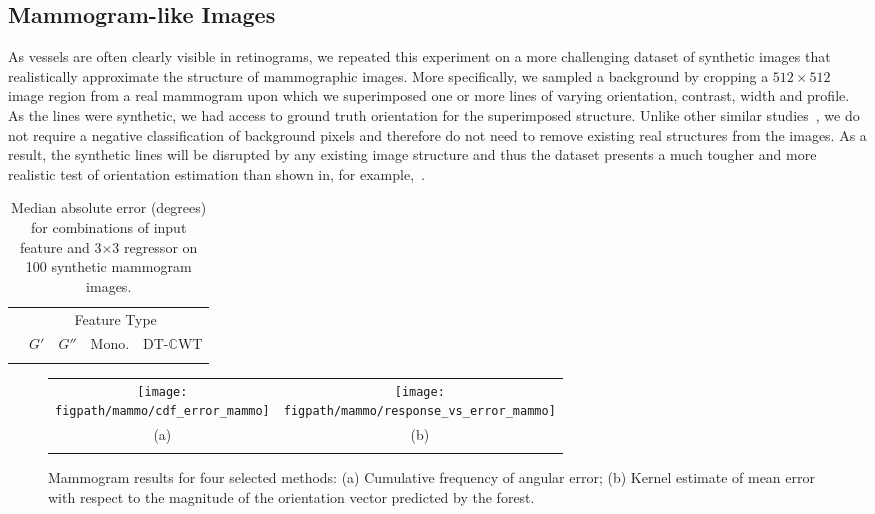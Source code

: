 \documentclass[10pt,twocolumn,letterpaper]{article}
\def\dtcwt{DT-$\mathbb{C}$WT}
\begin{document}
\subsection{Mammogram-like Images}
\label{s:expts_synth_mammography}
As vessels are often clearly visible in retinograms, we repeated this experiment on a more challenging dataset of synthetic images that realistically approximate the structure of mammographic images. More specifically, we sampled a background by cropping a $512{\times}512$ image region from a real mammogram upon which we superimposed one or more lines of varying orientation, contrast, width and profile. As the lines were synthetic, we had access to ground truth orientation for the superimposed structure. Unlike other similar studies~\cite{Berks_etal_IPMI11}, we do not require a negative classification of background pixels and therefore do not need to remove existing real structures from the images. As a result, the synthetic lines will be disrupted by any existing image structure and thus the dataset presents a much tougher and more realistic test of orientation estimation than shown in, for example,~\cite{Berks_etal_IPMI11}.

\begin{table}[t]
\centering
\begin{tabular}{l c c c c}
\toprule
							& \multicolumn{4}{c}{Feature Type} \\
							& $G'$		& $G''$	& Mono.				& \dtcwt \\
\cmidrule{2-5}

\bottomrule
\noalign{\smallskip}
\end{tabular}
%
\caption{Median absolute error (degrees) for combinations of input feature and {3{$\times$}3} regressor on 100 synthetic mammogram images.}
\label{t:synth_mammography}
\end{table}

\begin{figure}[t]
\centering
\begin{tabular}{c c}
\texttt{[image: \\figpath/mammo/cdf\_error\_mammo]} &
\texttt{[image: \\figpath/mammo/response\_vs\_error\_mammo]} \\
(a) & (b) \\
\noalign{\smallskip}
\end{tabular}
%
\caption{Mammogram results for four selected methods: (a) Cumulative frequency of angular error; (b) Kernel estimate of mean error with respect to the magnitude of the orientation vector predicted by the forest.}
\label{f:mammo_graphs}
\end{figure}
\end{document}

